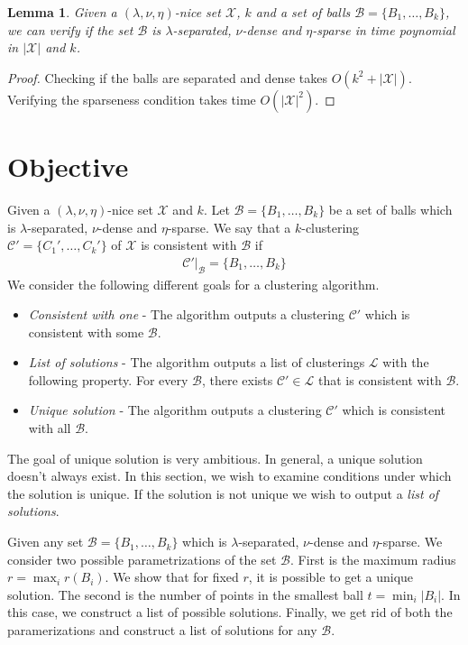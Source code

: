 \documentclass[twoside]{article}
\newcommand{\mc}{\mathcal}
\newtheorem{lemma}[theorem]{Lemma}
\begin{document}
\vspace{1mm}
\begin{lemma}
\label{lemma:chknice}
Given a $(\lambda,\nu, \eta)$-nice set $\mc X$, $k$ and a set of balls $\mc B = \{B_1,\ldots,B_k\}$, we can verify if the set $\mc B$ is $\lambda$-separated, $\nu$-dense and $\eta$-sparse in time poynomial in $|\mc X|$ and $k$.
\end{lemma}
\begin{proof}
Checking if the balls are separated and dense takes $O(k^2 + |\mc X|)$. Verifying the sparseness condition takes time $O(|\mc X|^2)$.
\end{proof}

\section{Objective}
Given a $(\lambda, \nu, \eta)$-nice set $\mc X$ and $k$. Let $\mc B = \{B_1,\ldots,B_k\}$ be a set of balls which is $\lambda$-separated, $\nu$-dense and $\eta$-sparse. We say that a $k$-clustering $\mc C' =\{C_1',\ldots,C_k'\}$ of $\mc X$ is consistent with $\mc B$ if
\begin{align*}
	\mc C'|_\mc B = \{B_1,\ldots,B_k\}
\end{align*}
We consider the following different goals for a clustering algorithm. 
\begin{itemize}[noitemsep,nolistsep]
\item {\em Consistent with one} - The algorithm outputs a clustering $\mc C'$ which is consistent with some $\mc B$.
\item {\em List of solutions} - The algorithm outputs a list of clusterings $\mc L$ with the following property. For every $\mc B$, there exists $\mc C' \in \mc L$ that is consistent with $\mc B$.
\item {\em Unique solution} - The algorithm outputs a clustering $\mc C'$ which is consistent with all $\mc B$.
\end{itemize}

The goal of unique solution is very ambitious. In general, a unique solution doesn't always exist. In this section, we wish to examine conditions under which the solution is unique. If the solution is not unique we wish to output a {\em list of solutions}.  

Given any set $\mc B = \{B_1,\ldots, B_k\}$ which is $\lambda$-separated, $\nu$-dense and $\eta$-sparse. We consider two possible parametrizations of the set $\mc B$. First is the maximum radius $r = \max_i r(B_i)$. We show that for fixed $r$, it is possible to get a unique solution. The second is the number of points in the smallest ball $t = \min_i |B_i|$. In this case, we construct a list of possible solutions. Finally, we get rid of both the paramerizations and construct a list of solutions for any $\mc B$.
\end{document}
